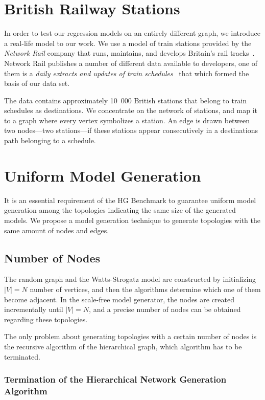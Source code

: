 \section{British Railway Stations}

In order to test our regression models on an entirely different graph, we introduce a real-life model to our work. We use a model of train stations provided by the \textit{Network Rail} company that runs, maintains, and develops Britain's rail tracks~\cite{network_rail}. Network Rail publishes a number of different data available to developers, one of them is a \textit{daily extracts and updates of train schedules}~\cite{schedules_data} that which formed the basis of our data set.

The data contains approximately 10~000 British stations that belong to train schedules as destinations. We concentrate on the network of stations, and map it to a graph where every vertex symbolizes a station. An edge is drawn between two nodes---\ie two stations---if these stations appear consecutively in a destinations path belonging to a schedule.

\section{Uniform Model Generation}\label{sec:uniform_generation}

It is an essential requirement of the HG Benchmark to guarantee uniform model generation among the topologies indicating the same size of the generated models. We propose a model generation technique to generate topologies with the same amount of nodes and edges.

\subsection{Number of Nodes}

The random graph and the Watts-Strogatz model are constructed by initializing $|V| = N$ number of vertices, and then the algorithms determine which one of them become adjacent. In the scale-free model generator, the nodes are created incrementally until $|V| = N$, and a precise number of nodes can be obtained regarding these topologies.

The only problem about generating topologies with a certain number of nodes is the recursive algorithm of the hierarchical graph, which algorithm has to be terminated.

\subsubsection{Termination of the Hierarchical Network Generation Algorithm}\label{sec:hierarcical_contribution}

